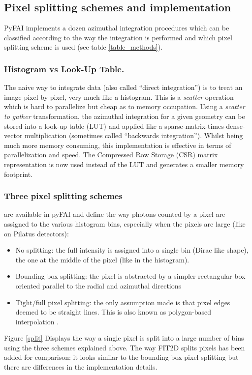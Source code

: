 \documentclass{iucr}
\begin{document}
\subsection{Pixel splitting schemes and implementation}

PyFAI implements a dozen azimuthal integration procedures which can be
classified according to the way the integration is performed and which pixel
splitting scheme is used (see table \ref{table_methods}).

\subsubsection{Histogram vs Look-Up Table.}
The naive way to integrate data (also called ``direct integration'') is to treat
an image pixel by pixel, very much like a histogram.
This is a \textit{scatter} operation which is hard to parallelize but cheap as
to memory occupation.
Using a \textit{scatter to gather} transformation, the azimuthal integration for
a given geometry can be stored into a look-up table (LUT) and applied like a
sparse-matrix-times-dense-vector multiplication (sometimes called
``backwards integration'').
Whilst being much more memory consuming, this
implementation is effective in terms of parallelization and speed.
The Compressed Row Storage (CSR) matrix representation is now used instead of
the LUT and generates a smaller memory footprint.

\subsubsection{Three pixel splitting schemes} are available in pyFAI and define
the way photons counted by a pixel are assigned to the various histogram bins,
especially when the pixels are large (like on Pilatus detectors):
\begin{itemize}
\item No splitting: the full intensity is assigned into a single bin (Dirac
like shape), the one at the middle of the pixel (like in the histogram).
\item Bounding box splitting: the pixel is abstracted by a simpler rectangular box
oriented parallel to the radial and azimuthal directions
\item
Tight/full pixel splitting: the only assumption made is that pixel
edges deemed to be straight lines. This is also known as polygon-based
interpolation \cite{stefanvdw}.
\end{itemize}
Figure \ref{split} Displays the way a single pixel is split into a
large number of bins using the three schemes explained above.
The way FIT2D splits pixels has been added for comparison: it looks
similar to the bounding box pixel splitting but there are differences
in the implementation details.
\end{document}
